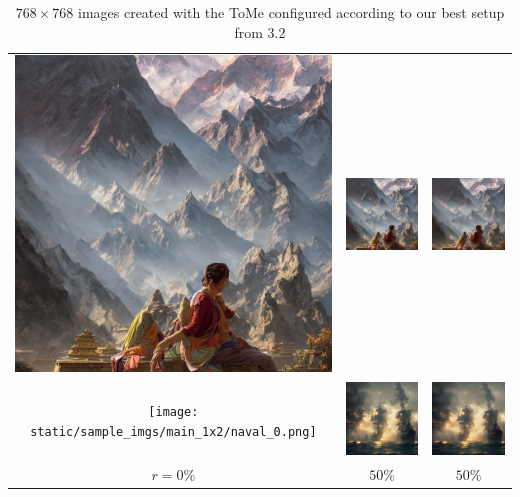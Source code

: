 \begin{table}[!htb]
\centering
\begin{tabular}{c c c}
    \includegraphics[width=0.3\linewidth]{static/sample_imgs/main_1x2/nepal_0.png} & \includegraphics[width=0.3\linewidth]{static/sample_imgs/main_1x2/nepal_20.png} &
    \includegraphics[width=0.3\linewidth]{static/sample_imgs/main_1x2/nepal_50.png}\\
    \texttt{[image: static/sample\_imgs/main\_1x2/naval\_0.png]} & \includegraphics[width=0.3\linewidth]{static/sample_imgs/main_1x2/naval_20.png} &
    \includegraphics[width=0.3\linewidth]{static/sample_imgs/main_1x2/naval_50.png}\\
    \(r=0\%\) & \(50\%\) & \(50\%\) \\
\end{tabular}
\caption{$768 \times 768$ images created with the ToMe configured according to our best setup from \(3.2\)}
\end{table}